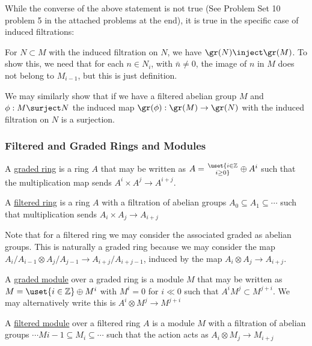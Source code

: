 \documentclass[12 pt]{article}
\theoremstyle{definition}
\newcommand\zz{\mathbb{Z}}
\begin{document}
While the converse of the above statement is not true (See Problem Set 10 problem 5 in the attached problems at the end), it is true in the specific case of induced filtrations:

For $N \subset M$ with the induced filtration on $N$, we have $\gr(N) \inject \gr(M)$. To show this, we need that for each $n \in N_i$, with $\bar{n} \neq 0$, the image of $n$ in $M$ does not belong to $M_{i-1}$, but this is just definition.

We may similarly show that if we have a filtered abelian group $M$ and $\phi: M \surject N$ the induced map $\gr(\phi):\gr(M) \to \gr(N)$ with the induced filtration on $N$ is a surjection.

\subsubsection{Filtered and Graded Rings and Modules}

\begin{definition} A \underline{graded ring} is a ring $A$ that may be written as $A=\uset{i \in \zz \atop i \geq 0}\oplus A^i$ such that the multiplication map sends $A^i \times A^j \to A^{i+j}$.
\end{definition}

\begin{definition} A \ul{filtered ring} is a ring $A$ with a filtration of abelian groups $A_0 \subseteq A_1 \subseteq \cdots$ such that multiplication sends $A_i \times A_j \to A_{i+j}$
\end{definition}

Note that for a filtered ring we may consider the associated graded as abelian groups. This is naturally a graded ring because we may consider the map $A_i/A_{i-1} \otimes A_j/A_{j-1} \to A_{i+j}/A_{i+j-1}$, induced by the map $A_i \otimes A_j \to A_{i+j}$.


\begin{definition} A \underline{graded module} over a graded ring is a module $M$ that may be written as $M=\uset{i \in \zz}\oplus M^i$ with $M^i=0$ for $i\ll 0$ such that $A^iM^j \subset M^{j+i}$. We may alternatively write this is $A^i \otimes M^j \to M^{j+i}$
\end{definition}

\begin{definition} A \ul{filtered module} over a filtered ring $A$ is a module $M$ with a filtration of abelian groups $\cdots M{i-1} \subseteq M_i \subseteq \cdots$ such that the action acts as $A_i \otimes M_j \to M_{i+j}$
\end{definition}
\end{document}
